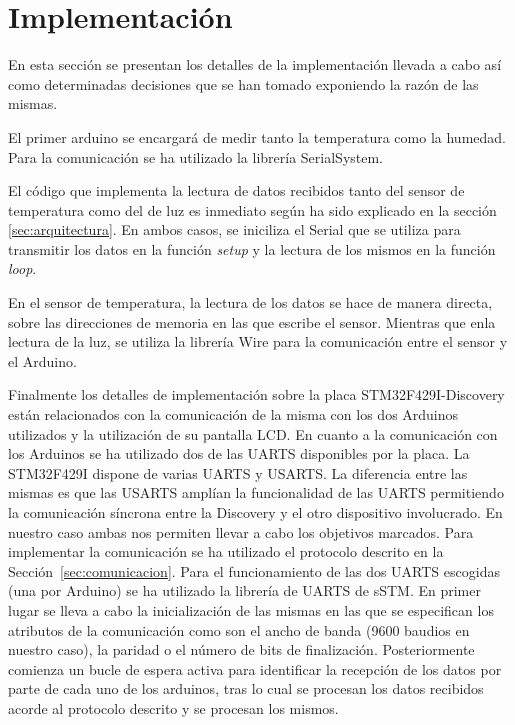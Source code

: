 \section{Implementaci\'on}\label{sec:imp}
En esta secci\'on se presentan los detalles de la implementaci\'on
llevada a cabo as\'i como determinadas decisiones que se han tomado
exponiendo la raz\'on de las mismas.

El primer arduino se encargar\'a de medir tanto la temperatura como la
humedad. Para la comunicaci\'on se ha utilizado la librer\'ia
SerialSystem. 

El c\'odigo que implementa la lectura de datos recibidos tanto del
sensor de temperatura como del de luz es inmediato seg\'un ha sido explicado en
la secci\'on \ref{sec:arquitectura}. En ambos casos, se iniciliza el
Serial que se utiliza para transmitir los datos en la funci\'on \emph{setup}
y la lectura de los mismos en la funci\'on \emph{loop}. 

En el sensor de temperatura, la lectura de los datos se hace de manera
directa, sobre las direcciones de memoria en las que escribe el sensor.
Mientras que enla lectura de la luz, se utiliza la librer\'ia Wire para la
comunicaci\'on entre el sensor y el Arduino. 

Finalmente los detalles de implementaci\'on sobre la placa
STM32F429I-Discovery est\'an relacionados con la comunicaci\'on de la
misma con los dos Arduinos utilizados y la utilizaci\'on de su
pantalla LCD. En cuanto a la comunicaci\'on con los Arduinos se ha
utilizado dos de las UARTS disponibles por la placa. La STM32F429I
dispone de varias UARTS y USARTS. La diferencia entre las mismas es
que las USARTS ampl\'ian la funcionalidad de las UARTS permitiendo la
comunicaci\'on s\'incrona entre la Discovery y el otro dispositivo
involucrado. En nuestro caso ambas nos permiten
llevar a cabo los objetivos marcados. Para implementar la
comunicaci\'on se ha utilizado el protocolo descrito en la
Secci\'on~\ref{sec:comunicacion}. Para el funcionamiento de las dos
UARTS escogidas (una por Arduino) se ha utilizado la librer\'ia de UARTS
de sSTM. En primer lugar se lleva a cabo la inicializaci\'on de las
mismas en las que se especifican los atributos de la comunicaci\'on
como son el ancho de banda (9600 baudios en nuestro caso), la paridad
o el n\'umero de bits de finalizaci\'on. Posteriormente comienza un
bucle de espera activa para identificar la recepci\'on de los datos
por parte de cada uno de los arduinos, tras lo cual se procesan los
datos recibidos acorde al protocolo descrito y se procesan los mismos.

